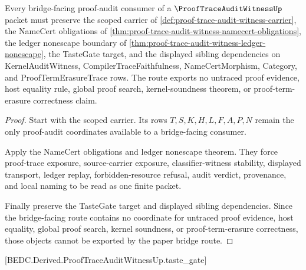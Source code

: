 \begin{theorem}
\label{thm:proof-trace-audit-bridge-route}
Every bridge-facing proof-audit consumer of a $\ProofTraceAuditWitnessUp$ packet must preserve the scoped carrier of \autoref{def:proof-trace-audit-witness-carrier}, the NameCert obligations of \autoref{thm:proof-trace-audit-witness-namecert-obligations}, the ledger nonescape boundary of \autoref{thm:proof-trace-audit-witness-ledger-nonescape}, the TasteGate target, and the displayed sibling dependencies on KernelAuditWitness, CompilerTraceFaithfulness, NameCertMorphism, Category, and ProofTermErasureTrace rows. The route exports no untraced proof evidence, host equality rule, global proof search, kernel-soundness theorem, or proof-term-erasure correctness claim.
\end{theorem}
\begin{proof}
Start with the scoped carrier. Its rows $T,S,K,H,L,F,A,P,N$ remain the only proof-audit coordinates available to a bridge-facing consumer.

Apply the NameCert obligations and ledger nonescape theorem. They force proof-trace exposure, source-carrier exposure, classifier-witness stability, displayed transport, ledger replay, forbidden-resource refusal, audit verdict, provenance, and local naming to be read as one finite packet.

Finally preserve the TasteGate target and displayed sibling dependencies. Since the bridge-facing route contains no coordinate for untraced proof evidence, host equality, global proof search, kernel soundness, or proof-term-erasure correctness, those objects cannot be exported by the paper bridge route.
\end{proof}

[BEDC.Derived.ProofTraceAuditWitnessUp.taste\_gate]

